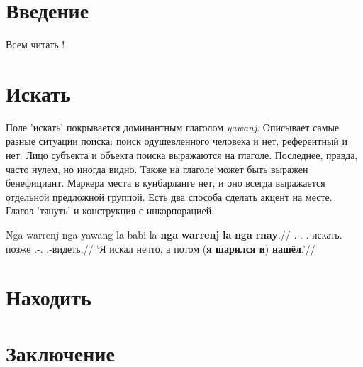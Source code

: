 \section{Введение}
Всем читать \cite{ik16bun}!


\section{Искать}
    Поле 'искать' покрывается доминантным глаголом \textit{yawanj}. Описывает самые разные ситуации поиска: поиск одушевленного человека и нет, референтный и нет. Лицо субъекта и объекта поиска выражаются на глаголе. Последнее, правда, часто нулем, но иногда видно. Также на глаголе может быть выражен бенефициант. Маркера места в кунбарланге нет, и оно всегда выражается отдельной предложной группой. 
    Есть два способа сделать акцент на месте. Глагол 'тянуть' и конструкция с инкорпорацией.

\begingl
\gla Nga-warrenj nga-yawang la babi la \textbf{nga}-\textbf{warrenj} \textbf{la} \textbf{nga}-\textbf{rnay}.//
\glb \Fsg.\Real-\warre.\Pst{} \Fsg.\Real-искать.\Pst{} \la{} позже \la{} \Fsg.\Real-\warre.\Pst{} \la{} \Fsg.\Real-видеть.\Pst{}//
\glft `Я искал нечто, а потом (\textbf{я шарился и}) \textbf{ нашёл}.'\trailingcitation{[IK1-170610\_1SY-02/54:02--10]}//
\endgl\xe

\section{Находить}

\section{Заключение}